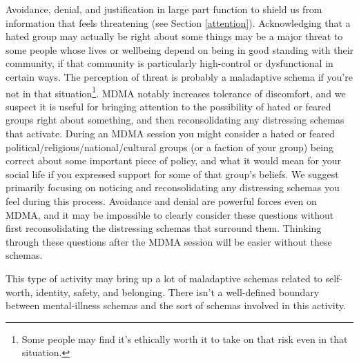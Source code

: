 \documentclass[12pt,letterpaper]{book}
\begin{document}
Avoidance, denial, and justification in large part function to shield us from information that feels threatening (see Section \ref{attention}). Acknowledging that a hated group may actually be right about some things may be a major threat to some people whose lives or wellbeing depend on being in good standing with their community, if that community is particularly high-control or dysfunctional in certain ways. The perception of threat is probably a maladaptive schema if you're not in that situation\footnote{Some people may find it's ethically worth it to take on that risk even in that situation.}. MDMA notably increases tolerance of discomfort, and we suspect it is useful for bringing attention to the possibility of hated or feared groups right about something, and then reconsolidating any distressing schemas that activate. During an MDMA session you might consider a hated or feared political/religious/national/cultural groups (or a faction of your group) being correct about some important piece of policy, and what it would mean for your social life if you expressed support for some of that group's beliefs. We suggest primarily focusing on noticing and reconsolidating any distressing schemas you feel during this process. Avoidance and denial are powerful forces even on MDMA, and it may be impossible to clearly consider these questions without first reconsolidating the distressing schemas that surround them. Thinking through these questions after the MDMA session will be easier without these schemas.

This type of activity may bring up a lot of maladaptive schemas related to self-worth, identity, safety, and belonging. There isn't a well-defined boundary between mental-illness schemas and the sort of schemas involved in this activity.
\end{document}
